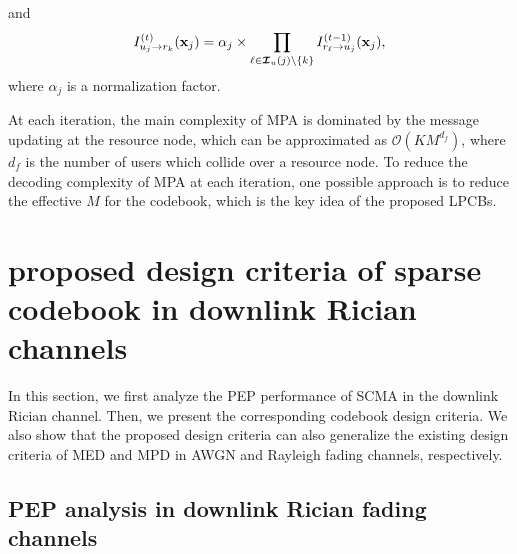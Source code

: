 \documentclass[journal]{IEEEtran}
\begin{document}
and
\begin{equation}
 \small
  \label{VN_up}
I_{u_j \rightarrow r_k}^{(t)}(\mathbf {x}_j) =\alpha _j\times \prod _{\ell \in \boldsymbol{\mathcal {I}}_u(j)\backslash \lbrace k\rbrace } I_{r_{\ell } \rightarrow u_j}^{(t-1)}(\mathbf {x}_j), \end{equation}
where $\alpha _j$ is  a normalization factor. 

 


At each iteration, the main complexity of MPA is   dominated  by the message updating at the resource node, which can be approximated as $\mathcal{O} \left(K M^{d_f}\right)$, where $d_f$ is the number of users which collide  over a resource node.    To reduce the decoding complexity of MPA at each iteration, one possible approach is to reduce the effective $M$ for the codebook, which is the key idea  of the proposed LPCBs. 


\section{proposed design criteria of sparse codebook in downlink Rician channels}
In this section, we first analyze  the PEP performance of SCMA in the downlink Rician channel. Then, we present the  corresponding  codebook design criteria. We also show that the proposed design criteria can also generalize the existing design criteria of MED and MPD   in  AWGN and Rayleigh fading channels, respectively.  

\subsection {PEP analysis in downlink Rician fading channels}
\end{document}
